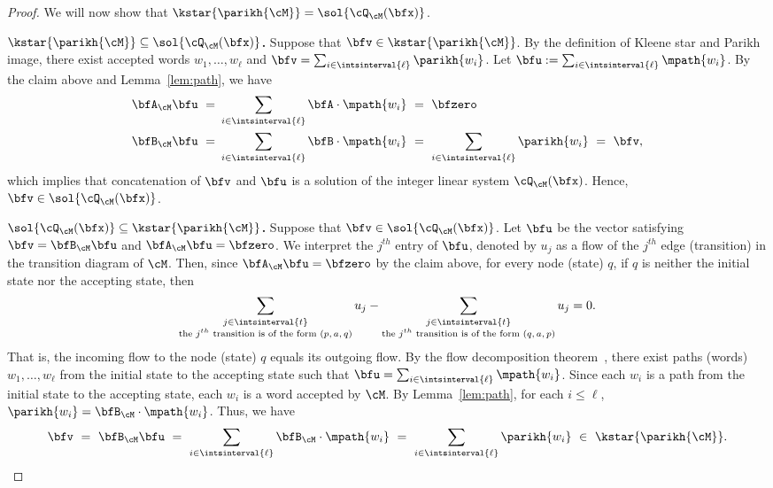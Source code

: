 \begin{proof}
    We will now show that
    $\kstar{\parikh{\cM}} = \sol{\cQ_\cM(\bfx)}$.

    \textbf{\uline{$\kstar{\parikh{\cM}} \subseteq \sol{\cQ_\cM(\bfx)}$}.}
    Suppose that $\bfv \in \kstar{\parikh{\cM}}$.
    By the definition of Kleene star and Parikh image,
    there exist accepted words $w_1, \ldots, w_\ell$
    and $\bfv = \sum_{i \in \intsinterval{\ell}} \parikh{w_i}$.
    Let $\bfu := \sum_{i \in \intsinterval{\ell}} \mpath{w_i}$.
    By the claim above and Lemma~\ref{lem:path}, we have
    \begin{equation*}
        \begin{aligned}
            \bfA_\cM \bfu\ =\ &\sum_{i \in \intsinterval{\ell}} \bfA \cdot \mpath{w_i}\ =\ \bfzero \\
            \bfB_\cM \bfu\ =\ &\sum_{i \in \intsinterval{\ell}} \bfB \cdot \mpath{w_i}
            \ =\ \sum_{i \in \intsinterval{\ell}} \parikh{w_i}\ =\ \bfv,
        \end{aligned}
    \end{equation*}
    which implies that concatenation of $\bfv$ and $\bfu$ is a solution of the integer linear system $\cQ_\cM(\bfx)$.
    Hence, $\bfv \in \sol{\cQ_\cM(\bfx)}$.

    \textbf{\uline{$\sol{\cQ_\cM(\bfx)}\subseteq\kstar{\parikh{\cM}}$}.}
    Suppose that $\bfv \in \sol{\cQ_\cM(\bfx)}$.
    Let $\bfu$ be the vector satisfying $\bfv = \bfB_\cM\bfu$ and $\bfA_\cM\bfu = \bfzero$.
    We interpret the $j^{th}$ entry of $\bfu$, denoted by $u_j$
    as a flow of the $j^{th}$ edge (transition) in the transition diagram of $\cM$.
    Then, since $\bfA_\cM\bfu = \bfzero$ by the claim above,
    for every node (state) $q$,
    if $q$ is neither the initial state nor the accepting state,
    then 
    \begin{equation*}
        \sum_{\substack{
                j \in \intsinterval{t}\\
                \text{the $j^{th}$ transition is of the form $(p, a, q)$}
        }} u_j
        -
        \sum_{\substack{
                j \in \intsinterval{t}\\
                \text{the $j^{th}$ transition is of the form $(q, a, p)$}
        }} u_j
        = 0.
    \end{equation*}
    That is, the incoming flow to the node (state) $q$ equals its outgoing flow.
    By the flow decomposition theorem~\cite{flow},
    there exist paths (words) $w_1, \ldots, w_\ell$ from the initial state to the accepting state
    such that $\bfu = \sum_{i \in \intsinterval{\ell}} \mpath{w_i}$.
    Since each $w_i$ is a path from the initial state to the accepting state, each
    $w_i$ is a word accepted by $\cM$.
    By Lemma~\ref{lem:path}, for each $i \leq \ell$, $\parikh{w_i} = \bfB_\cM\cdot\mpath{w_i}$.
    Thus, we have
    \begin{equation*}
        \bfv
        \ =\ \bfB_\cM\bfu
        \ =\ \sum_{i \in \intsinterval{\ell}} \bfB_\cM\cdot\mpath{w_i}
        \ =\ \sum_{i \in \intsinterval{\ell}} \parikh{w_i}
        \ \in\ \kstar{\parikh{\cM}}.
    \end{equation*}
\end{proof}

